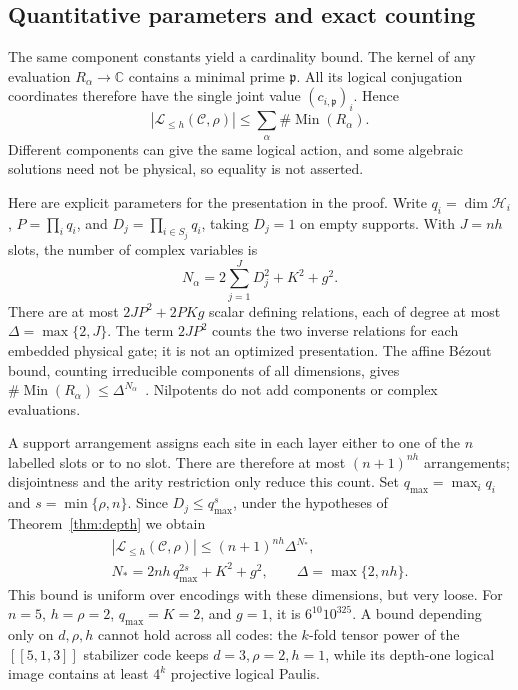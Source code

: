 \documentclass[aps,prl,reprint,notitlepage,nofootinbib,nobibnotes]{revtex4-2}
\newcommand{\HH}{\mathcal H}
\begin{document}
\subsection*{Quantitative parameters and exact counting}

The same component constants yield a cardinality bound. The kernel of
any evaluation \(R_\alpha\to\mathbb C\) contains a minimal prime
\(\mathfrak p\). All its logical conjugation coordinates therefore
have the single joint value \((c_{i,\mathfrak p})_i\). Hence
\begin{equation}\label{eq:component-bound}
 |\mathcal L_{\le h}(\mathcal C,\rho)|
 \le \sum_\alpha \#\operatorname{Min}(R_\alpha).
\end{equation}
Different components can give the same logical action, and some
algebraic solutions need not be physical, so equality is not asserted.

Here are explicit parameters for the presentation in the proof.
Write \(q_i=\dim\HH_i\), \(P=\prod_iq_i\), and
\(D_j=\prod_{i\in S_j}q_i\), taking \(D_j=1\) on empty supports.
With \(J=nh\) slots, the number of complex variables is
\begin{equation}\label{eq:coordinate-count}
 N_\alpha=2\sum_{j=1}^{J}D_j^2+K^2+g^2.
\end{equation}
There are at most
\(2JP^2+2PKg\) scalar defining relations, each of degree
at most \(\Delta=\max\{2,J\}\). The term \(2JP^2\) counts the two
inverse relations for each embedded physical gate; it is not an
optimized presentation. The affine B\'ezout bound, counting
irreducible components of all dimensions, gives
\(\#\operatorname{Min}(R_\alpha)\le\Delta^{N_\alpha}\)~\cite{BurgisserScheiblechner}.
Nilpotents do not add components or complex evaluations.

A support arrangement assigns each site in each layer either to one
of the \(n\) labelled slots or to no slot. There are therefore at most
\((n+1)^{nh}\) arrangements; disjointness and the arity restriction
only reduce this count. Set \(q_{\max}=\max_iq_i\) and
\(s=\min\{\rho,n\}\). Since \(D_j\le q_{\max}^{s}\), under the
hypotheses of Theorem~\ref{thm:depth} we obtain
\begin{equation}\label{eq:explicit-bound}
 \begin{gathered}
 |\mathcal L_{\le h}(\mathcal C,\rho)|
       \le (n+1)^{nh}\Delta^{N_*},\\
 N_*=2nh\,q_{\max}^{2s}+K^2+g^2,\qquad
 \Delta=\max\{2,nh\}.
 \end{gathered}
\end{equation}
This bound is uniform over encodings with these dimensions, but very
loose. For \(n=5\), \(h=\rho=2\), \(q_{\max}=K=2\), and \(g=1\),
it is \(6^{10}10^{325}\). A bound depending only on \(d,\rho,h\)
cannot hold across all codes: the \(k\)-fold tensor power of the
\([[5,1,3]]\) stabilizer code keeps \(d=3,\rho=2,h=1\), while its
depth-one logical image contains at least \(4^k\) projective logical
Paulis.
\end{document}
